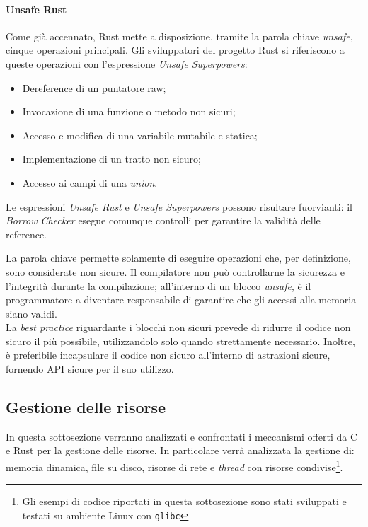 \paragraph{Unsafe Rust}
Come già accennato, Rust mette a disposizione, tramite la parola chiave \textit{unsafe}, cinque operazioni principali. Gli sviluppatori
del progetto Rust si riferiscono a queste operazioni con l'espressione \textit{Unsafe Superpowers}:
\begin{itemize}
    \item Dereference di un puntatore raw;
    \item Invocazione di una funzione o metodo non sicuri;
    \item Accesso e modifica di una variabile mutabile e statica;
    \item Implementazione di un tratto non sicuro;
    \item Accesso ai campi di una \textit{union}.
\end{itemize}
Le espressioni \textit{Unsafe Rust} e \textit{Unsafe Superpowers} possono risultare fuorvianti: il \textit{Borrow Checker} esegue 
comunque controlli per garantire la validità delle reference. 

La parola chiave permette solamente di eseguire operazioni che, per definizione, sono considerate non sicure. 
Il compilatore non può controllarne la sicurezza e l'integrità durante la compilazione; all'interno di un blocco
 \textit{unsafe}, è il programmatore a diventare responsabile di garantire che gli accessi alla memoria
siano validi. \hfill
\vspace{12pt}\\
\noindent La \textit{best practice} riguardante i blocchi non sicuri prevede di ridurre il codice non sicuro il più possibile, utilizzandolo solo quando strettamente necessario.
Inoltre, è preferibile incapsulare il codice non sicuro all'interno di astrazioni sicure, fornendo API sicure per il suo utilizzo. \hfill

\subsection{Gestione delle risorse}
In questa sottosezione verranno analizzati e confrontati i meccanismi offerti da C e Rust per la gestione delle risorse. In particolare
verrà analizzata la gestione di: memoria dinamica, file su disco, risorse di rete e \textit{thread} con risorse condivise\footnote{Gli esempi di codice riportati in questa sottosezione sono stati sviluppati e testati su ambiente Linux con \texttt{glibc}}.

